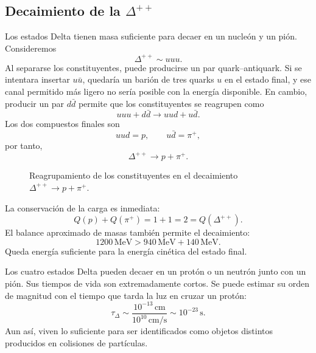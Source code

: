 \subsection{Decaimiento de la \texorpdfstring{\(\Delta^{++}\)}{Delta++}}

Los estados Delta tienen masa suficiente para decaer en un nucleón y un pión. Consideremos
\begin{equation}
\Delta^{++}\sim uuu.
\end{equation}
Al separarse los constituyentes, puede producirse un par quark--antiquark. Si se intentara insertar \(u\bar u\), quedaría un barión de tres quarks \(u\) en el estado final, y ese canal permitido más ligero no sería posible con la energía disponible. En cambio, producir un par \(d\bar d\) permite que los constituyentes se reagrupen como
\begin{equation}
uuu+d\bar d
\longrightarrow
uud+u\bar d.
\end{equation}
Los dos compuestos finales son
\begin{equation}
uud=p,
\qquad
u\bar d=\pi^+,
\end{equation}
por tanto,
\begin{equation}
\Delta^{++}\longrightarrow p+\pi^+.
\end{equation}

\begin{figure}[h]
\centering
{}
\caption{Reagrupamiento de los constituyentes en el decaimiento \(\Delta^{++}\rightarrow p+\pi^+\).}
\end{figure}

La conservación de la carga es inmediata:
\begin{equation}
Q(p)+Q(\pi^+)=1+1=2=Q(\Delta^{++}).
\end{equation}
El balance aproximado de masas también permite el decaimiento:
\begin{equation}
1200\,\mathrm{MeV}
>
940\,\mathrm{MeV}+140\,\mathrm{MeV}.
\end{equation}
Queda energía suficiente para la energía cinética del estado final.

Los cuatro estados Delta pueden decaer en un protón o un neutrón junto con un pión. Sus tiempos de vida son extremadamente cortos. Se puede estimar su orden de magnitud con el tiempo que tarda la luz en cruzar un protón:
\begin{equation}
\tau_\Delta
\sim
\frac{10^{-13}\,\mathrm{cm}}
     {10^{10}\,\mathrm{cm/s}}
\sim10^{-23}\,\mathrm{s}.
\end{equation}
Aun así, viven lo suficiente para ser identificados como objetos distintos producidos en colisiones de partículas.

